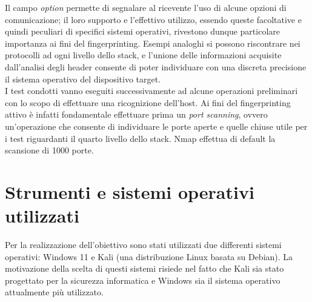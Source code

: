 Il campo \textit{option} permette di segnalare al ricevente l'uso di alcune opzioni di comunicazione; il loro supporto e l'effettivo utilizzo, essendo queste facoltative e quindi peculiari di specifici sistemi operativi, rivestono dunque particolare importanza ai fini del fingerprinting.
Esempi analoghi si possono riscontrare nei protocolli ad ogni livello dello stack, e l'unione delle informazioni acquisite dall'analisi degli header consente di poter individuare con una discreta precisione il sistema operativo del dispositivo target.
\\
I test condotti vanno eseguiti successivamente ad alcune operazioni preliminari con lo scopo di effettuare una ricognizione dell'host. Ai fini del fingerprinting attivo è infatti fondamentale effettuare prima un \textit{port scanning}, ovvero un'operazione che consente di individuare le porte aperte e quelle chiuse utile per i test riguardanti il quarto livello dello stack. Nmap effettua di default la scansione di 1000 porte.

\section{Strumenti e sistemi operativi utilizzati}
Per la realizzazione dell'obiettivo sono stati utilizzati due differenti sistemi operativi: Windows 11 e Kali (una distribuzione Linux basata su Debian).
La motivazione della scelta di questi sistemi risiede nel fatto che Kali sia stato progettato per la sicurezza informatica e Windows sia il sistema operativo attualmente più utilizzato.

